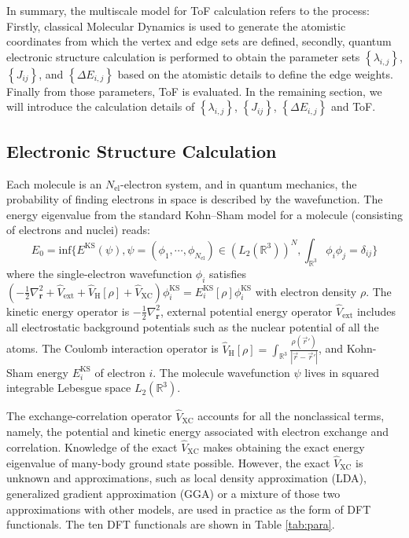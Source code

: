 \documentclass[letterpaper,12pt]{article}
\begin{document}
In summary, the multiscale model for ToF calculation refers to the process: Firstly, classical Molecular Dynamics is used to generate the atomistic coordinates from which the vertex and edge sets are defined,
secondly, quantum electronic structure calculation is performed to obtain the parameter sets $\left\{\lambda_{i,j}\right\}$,  $\left\{J_{ij}\right\}$, and $\left\{\Delta E_{i,j}\right\}$ based on the atomistic details to define the edge weights. Finally from those parameters, ToF is evaluated.
In the remaining section, we will introduce the calculation details of $\left\{\lambda_{i,j}\right\}$,  $\left\{J_{ij}\right\}$, $\left\{\Delta E_{i,j}\right\}$ and ToF. 

\subsection{Electronic Structure Calculation} 
Each molecule is an $N_\text{el}$-electron system, and in quantum mechanics, the probability of finding electrons in space is described by the wavefunction.
The energy eigenvalue from the standard Kohn–Sham model \cite{kohn_self_1965} for a molecule (consisting of electrons and nuclei) reads:
\begin{equation}
    E_0 = \text{inf}\{ E^\text{KS}(\psi),\psi=(\phi_1,\cdots,\phi_{N_\text{el}}) \in (L_2(\mathbb{R}^3))^N, \int_{\mathbb{R}^3} \phi_i \phi_j =\delta_{ij} \} 
    \label{eq:KS_model}
\end{equation}
where the single-electron wavefunction $\phi_i$ satisfies $(-\frac{1}{2}\nabla^2_\mathbf{r} + \hat{V}_\text{ext} + \hat{V}_\text{H}[\rho] + \hat{V}_\text{XC}) \phi_i^\text{KS} =  E^\text{KS}_i[\rho] \phi^\text{KS}_i$ with electron density $\rho$. 
The kinetic energy operator is $-\frac{1}{2}\nabla^2_\mathbf{r}$, external potential energy operator $\hat{V}_\text{ext}$ includes all electrostatic background potentials such as the nuclear potential of all the atoms.
The Coulomb interaction operator is $\hat{V}_\text{H}[\rho] = \int_{\mathbb{R}^3} \frac{\rho(\vec{r}')}{ |\vec{r} - \vec{r}'| }$, and Kohn-Sham energy $E^\text{KS}_i$ of electron $i$. The molecule wavefunction $\psi$ lives in squared integrable Lebesgue space $L_2(\mathbb{R}^3)$. 

The exchange-correlation operator $\hat{V}_\text{XC}$ accounts for all the nonclassical terms, namely, the potential and kinetic energy associated with electron exchange and correlation. Knowledge of the exact $\hat{V}_\text{XC}$ makes obtaining the exact energy eigenvalue of many-body ground state possible. However, the exact $\hat{V}_\text{XC}$ is unknown and approximations, such as local density approximation (LDA), generalized gradient approximation (GGA) or a mixture of those two approximations with other models, are used in practice as the form of DFT functionals. 
The ten DFT functionals are shown in Table \ref{tab:para}.
\end{document}
